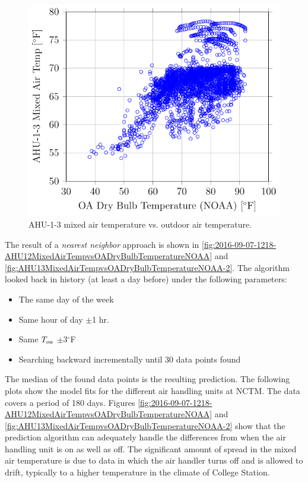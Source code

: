 \begin{figure}
\centering
\includegraphics[]{Plots/2016-06-13-1459-AHU13MixedAirTempvsOADryBulbTemperatureNOAA.pdf}
\caption{AHU-1-3 mixed air temperature vs. outdoor air temperature.}
\label{fig:AHU13MixedAirTempvsOADryBulbTemperatureNOAA}
\end{figure}


The result of a \textit{nearest neighbor} approach is shown in \figref{}
\ref{fig:2016-09-07-1218-AHU12MixedAirTempvsOADryBulbTemperatureNOAA} and
\ref{fig:AHU13MixedAirTempvsOADryBulbTemperatureNOAA-2}. The algorithm looked
back in history (at least a day before) under the following parameters:

\begin{itemize}
    \item The same day of the week
    \item Same hour of day \(\pm\)1 hr.
    \item Same \(T_{oa}{}\) \(\pm\)3\(^\circ\)F
    \item Searching backward incrementally until 30 data points found
\end{itemize}

The median of the found data points is the resulting prediction. The following
plots show the model fits for the different air handling units at NCTM. The
data covers a period of 180 days. Figures
\ref{fig:2016-09-07-1218-AHU12MixedAirTempvsOADryBulbTemperatureNOAA} and
\ref{fig:AHU13MixedAirTempvsOADryBulbTemperatureNOAA-2} show that the
prediction algorithm can adequately handle the differences from when the air
handling unit is on as well as off. The significant amount of spread in the
mixed air temperature is due to data in which the air handler turns off and is
allowed to drift, typically to a higher temperature in the climate of College
Station. 

